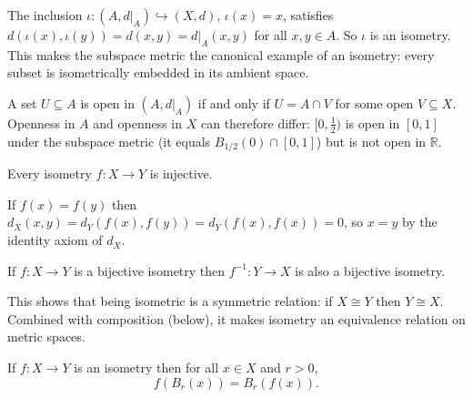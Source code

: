 \begin{remark*}
The inclusion $\iota : (A, d|_A) \hookrightarrow (X,d)$, $\iota(x) = x$,
satisfies $d(\iota(x), \iota(y)) = d(x,y) = d|_A(x,y)$ for all $x,y \in A$.
So $\iota$ is an isometry.
This makes the subspace metric the canonical example of an isometry:
every subset is isometrically embedded in its ambient space.
\end{remark*}

\begin{remark*}
A set $U \subseteq A$ is open in $(A, d|_A)$ if and only if
$U = A \cap V$ for some open $V \subseteq X$.
Openness in $A$ and openness in $X$ can therefore differ:
$[0, \tfrac{1}{2})$ is open in $[0,1]$ under the subspace metric
(it equals $B_{1/2}(0) \cap [0,1]$) but is not open in $\mathbb{R}$.
\end{remark*}


\begin{proposition}
\label{prop:isometry-injective}
Every isometry $f : X \to Y$ is injective.
\end{proposition}

\begin{remark*}
If $f(x) = f(y)$ then $d_X(x,y) = d_Y(f(x),f(y)) = d_Y(f(x),f(x)) = 0$,
so $x = y$ by the identity axiom of $d_X$.
\end{remark*}

\begin{proposition}
\label{prop:inverse-isometry}
If $f : X \to Y$ is a bijective isometry then $f^{-1} : Y \to X$
is also a bijective isometry.
\end{proposition}

\begin{remark*}[Consequence]
This shows that being isometric is a symmetric relation: if $X \cong Y$
then $Y \cong X$.
Combined with composition (below), it makes isometry an equivalence
relation on metric spaces.
\end{remark*}

\begin{proposition}
\label{prop:isometry-preserves-balls}
If $f : X \to Y$ is an isometry then for all $x \in X$ and $r > 0$,
\[
f\!\left(B_r(x)\right) = B_r\!\left(f(x)\right).
\]
\end{proposition}

